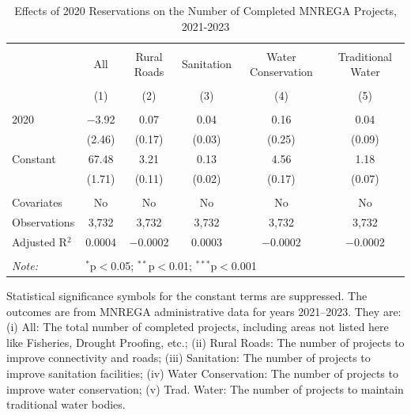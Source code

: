 \begin{table}[!htbp]
\centering
\begin{threeparttable}

  \caption{Effects of 2020 Reservations on the Number of Completed MNREGA Projects, 2021-2023} 
  \label{main_mnrega_20} 
\scriptsize 
\begin{tabular}{@{\extracolsep{0pt}}lccccc} 
\\[-1.8ex]\hline 
\hline \\[-1.8ex] 
 & All & Rural Roads & Sanitation & Water Conservation & Traditional Water \\ 
\\[-1.8ex] & (1) & (2) & (3) & (4) & (5)\\ 
\hline \\[-1.8ex] 
 2020 & $-$3.92 & 0.07 & 0.04 & 0.16 & 0.04 \\ 
  & (2.46) & (0.17) & (0.03) & (0.25) & (0.09) \\ 
  Constant & 67.48 & 3.21 & 0.13 & 4.56 & 1.18 \\ 
  & (1.71) & (0.11) & (0.02) & (0.17) & (0.07) \\ 
 \hline \\[-1.8ex] 
Covariates & No & No & No & No & No \\ 
Observations & 3,732 & 3,732 & 3,732 & 3,732 & 3,732 \\ 
Adjusted R$^{2}$ & 0.0004 & $-$0.0002 & 0.0003 & $-$0.0002 & $-$0.0002 \\ 
\hline 
\hline \\[-1.8ex] 
\textit{Note:}  & \multicolumn{5}{l}{$^{*}$p$<$0.05; $^{**}$p$<$0.01; $^{***}$p$<$0.001} \\ 
\end{tabular} 
\begin{tablenotes}[flushleft]
\scriptsize
\item[] Statistical significance symbols for the constant terms are suppressed. The outcomes are from MNREGA administrative data for years 2021--2023. They are: 
(i) All: The total number of completed projects, including areas not listed here like Fisheries, Drought Proofing, etc.;
(ii) Rural Roads: The number of projects to improve connectivity and roads;
(iii) Sanitation: The number of projects to improve sanitation facilities;
(iv) Water Conservation: The number of projects to improve water conservation;
(v) Trad. Water: The number of projects to maintain traditional water bodies.
\end{tablenotes}
\end{threeparttable}
\end{table}
